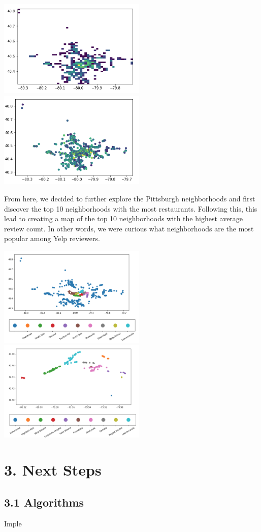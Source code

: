 \documentclass{neu_handout}
\begin{document}
\begin{center}
\includegraphics[width=70mm,scale=0.5]{pa_rest_density}
\includegraphics[width=70mm,scale=0.5]{pa_popular_restaurants}
\end{center}

From here, we decided to further explore the Pittsburgh neighborhoods and first discover the top 10 neighborhoods with the most restaurants. Following this, this lead to creating a map of the top 10 neighborhoods with the highest average review count. In other words, we were curious what neighborhoods are the most popular among Yelp reviewers.

\begin{center}
\includegraphics[width=70mm,scale=0.5]{pitts_hoods_most_restaurants}
\includegraphics[width=70mm,scale=0.5]{top_10_most_popular_neighborhoods}
\end{center}

\section*{3. Next Steps}

\subsection*{3.1 Algorithms}
Imple
\end{document}
